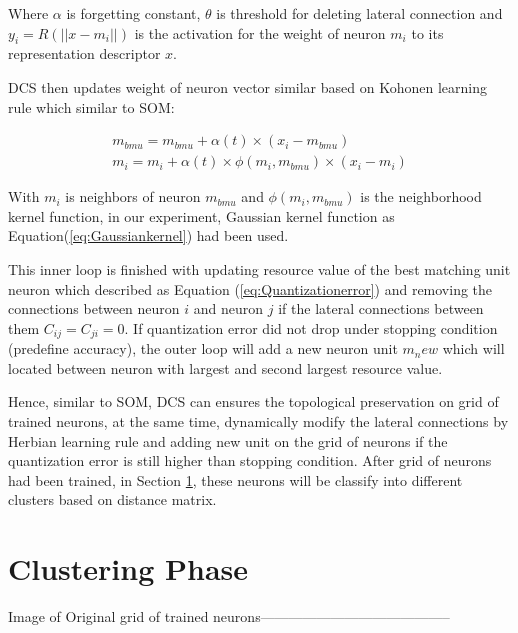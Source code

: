 Where $\alpha$ is forgetting constant, $\theta$ is threshold for deleting lateral connection and $y_i = R(|| x - m_i ||)$ is the activation for the weight of neuron $m_i$ to its representation descriptor $x$.
  
DCS then updates weight of neuron vector similar based on Kohonen learning rule \cite{kohonen1990self} which similar to SOM:

\begin{equation}
\begin{split}
 m_{bmu} = m_{bmu} + \alpha(t) \times (x_{i}-m_{bmu}) \\
 m_{i} = m_{i} + \alpha(t) \times \phi(m_i,m_{bmu}) \times (x_{i}-m_{i})
\end{split}
\end{equation}

With $m_{i}$ is neighbors of neuron $m_{bmu}$ and $\phi(m_i,m_{bmu})$ 
is the neighborhood kernel function, in our experiment, Gaussian kernel function as Equation(\ref{eq:Gaussiankernel}) had been used.

This inner loop is finished with updating resource value of the best matching unit neuron which described as Equation (\ref{eq:Quantizationerror}) and removing the connections between neuron $i$ and neuron $j$ if the lateral connections between them $C_{ij} = C_{ji} = 0$. If quantization error did not drop under stopping condition (predefine accuracy), the outer loop will add a new neuron unit $m_new$ which will located between neuron with largest and second largest resource value.

Hence, similar to SOM, DCS can ensures the topological preservation on grid of trained neurons, at the same time, dynamically modify the lateral connections by Herbian learning rule \cite{martinetz1993competitive} and adding new unit on the grid of neurons if the quantization error is still higher than stopping condition. After grid of neurons had been trained, in Section \ref{sec:Clustering Phase}, these neurons will be classify into different clusters based on distance matrix.

\section{Clustering Phase}
\label{sec:Clustering Phase}
Image of Original grid of trained neurons-----------------------------------------

